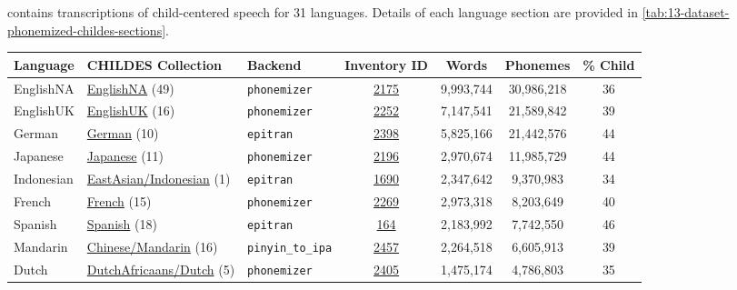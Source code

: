 \ipachildes contains transcriptions of child-centered speech for 31 languages. Details of each language section are provided in \cref{tab:13-dataset-phonemized-childes-sections}.  

\begin{table}[t]
    \centering
    \footnotesize
    \begin{tabular}{lllcccc}
        \toprule
        \textbf{Language} & \textbf{CHILDES Collection} & \textbf{Backend} & \textbf{Inventory ID} & \textbf{Words} & \textbf{Phonemes} & \textbf{\% Child} \\ 
        \midrule
        EnglishNA & \href{https://childes.talkbank.org/access/eng-na}{EnglishNA} (49) & \texttt{phonemizer} & \href{https://phoible.org/inventories/view/2175}{2175} & 9,993,744 & 30,986,218 & 36 \\
        EnglishUK & \href{https://childes.talkbank.org/access/eng-uk}{EnglishUK} (16) & \texttt{phonemizer} & \href{https://phoible.org/inventories/view/2252}{2252} & 7,147,541 & 21,589,842 & 39 \\
        German & \href{https://childes.talkbank.org/access/german}{German} (10) & \texttt{epitran} & \href{https://phoible.org/inventories/view/2398}{2398} & 5,825,166 & 21,442,576 & 44 \\
        Japanese & \href{https://childes.talkbank.org/access/japanese}{Japanese} (11) & \texttt{phonemizer} & \href{https://phoible.org/inventories/view/2196}{2196} & 2,970,674 & 11,985,729 & 44 \\
        Indonesian & \href{https://childes.talkbank.org/access/eastasian}{EastAsian/Indonesian} (1) & \texttt{epitran} & \href{https://phoible.org/inventories/view/1690}{1690} & 2,347,642 & 9,370,983 & 34 \\
        French & \href{https://childes.talkbank.org/access/french}{French} (15) & \texttt{phonemizer} & \href{https://phoible.org/inventories/view/2269}{2269} & 2,973,318 & 8,203,649 & 40 \\
        Spanish & \href{https://childes.talkbank.org/access/spanish}{Spanish} (18) & \texttt{epitran} & \href{https://phoible.org/inventories/view/164}{164} & 2,183,992 & 7,742,550 & 46 \\
        Mandarin & \href{https://childes.talkbank.org/access/chinese}{Chinese/Mandarin} (16) & \texttt{pinyin\_to\_ipa} & \href{https://phoible.org/inventories/view/2457}{2457} & 2,264,518 & 6,605,913 & 39 \\
        Dutch & \href{https://childes.talkbank.org/access/dutchafricaans}{DutchAfricaans/Dutch} (5) & \texttt{phonemizer} & \href{https://phoible.org/inventories/view/2405}{2405} & 1,475,174 & 4,786,803 & 35 \\

\end{tabular}
\end{table}
